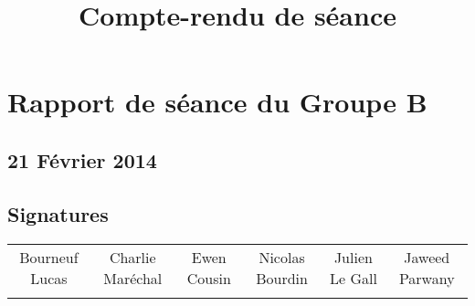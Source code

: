 
\title{Compte-rendu de séance}
\author{}
\date{} 

\pagestyle{empty} 
\pagestyle{fancy} 







\chapter*{Rapport de séance du Groupe B}	
\section*{21 Février 2014}
	\vspace{12.1cm}


\section*{Signatures}

    	\begin{tabular*}{0.75\textwidth}{c | c | c | c | c | c}
    	    Bourneuf Lucas & Charlie Maréchal & Ewen Cousin & Nicolas Bourdin & Julien Le Gall & Jaweed Parwany\\
     	     & & & & &
    	\end{tabular*}





